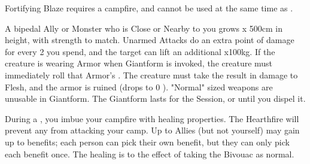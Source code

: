 \begin{multicols*}{2}

Fortifying Blaze requires a campfire, and cannot be used at the same time as .


\LITURGY [
  Name = Giantform,
  Link = arcana-mystery-giantform,
  Paradigm = J{\UmlautO}tnar,
  Duration = Session
]

A bipedal Ally or Monster who is Close or Nearby to you grows \DICE x 500cm in height, with strength to match. Unarmed Attacks do an extra point of damage for every 2 \DICE you spend, and the target can lift an additional \DICE x100kg. If the creature is wearing Armor when Giantform is invoked, the creature must immediately roll that Armor's \UD. The creature must take the result in damage to Flesh, and the armor is ruined (drops to 0 \MAX \UD).  "Normal" sized weapons are unusable in Giantform. The Giantform lasts for the Session, or until you dispel it.

\LITURGY [
  Name = Hearthfire,
  Link = arcana-mystery-hearthfire,
  Paradigm = Heathen,
  Duration = Bivouac
]

During a , you imbue your campfire with healing properties. The Hearthfire will prevent any  from attacking your camp. Up to \DICE Allies (but not yourself) may gain up to \DICE benefits; each person can pick their own benefit, but they can only pick each benefit once.  The healing is  to the effect of taking the Bivouac as normal.



\end{multicols*}

